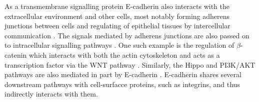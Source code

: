 As a transmembrane signalling protein \gls{E-cadherin} also interacts with the extracellular environment and other cells, most notably forming adherens junctions between cells \citep{Chen2014, Tunggal2005} and regulating of epithelial tissues by intercellular communication \citep{Jeanes2008}. %
%
The signals mediated by adherens junctions are also passed on to intracellular signalling pathways . %
One such example is the regulation of $\beta$-catenin which interacts with both the actin cytoskeleton and acts as a transcription factor via the \gls{WNT} pathway \citep{Jeanes2008}. Similarly, the Hippo and \gls{PI3K}/AKT pathways are also mediated in part by \gls{E-cadherin} \citep{DeSantis2009, Kim2011}. %
\gls{E-cadherin} shares several downstream pathways with cell-surfacce proteins, such as integrins, and thus indirectly interacts with them. %


